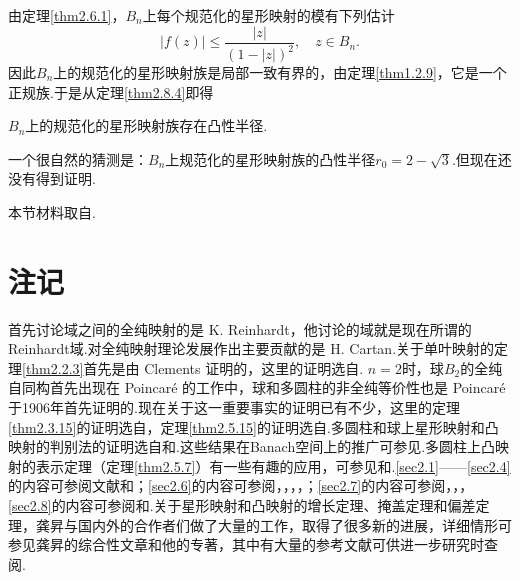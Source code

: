 由定理\ref{thm2.6.1}，$B_n$上每个规范化的星形映射的模有下列估计
\[|f(z)|\le\frac{|z|}{(1-|z|)^2},\quad z\in B_n.\]
因此$B_n$上的规范化的星形映射族是局部一致有界的，由定理\ref{thm1.2.9}，它是一个正规族.于是从定理\ref{thm2.8.4}即得
\begin{theorem}\label{thm2.8.6}
	$B_n$上的规范化的星形映射族存在凸性半径.
\end{theorem}
一个很自然的猜测是：$B_n$上规范化的星形映射族的凸性半径$r_0=2-\sqrt{3}$.但现在还没有得到证明.

本节材料取自\cite{史济怀1982bound}.
\section*{注记}
首先讨论域之间的全纯映射的是 K. Reinhardt，他讨论的域就是现在所谓的Reinhardt域.对全纯映射理论发展作出主要贡献的是 H. Cartan\cite[141—254，255—275，336—369]{cartan1979collected}.关于单叶映射的定理\ref{thm2.2.3}首先是由 Clements 证明的，这里的证明选自\cite{narasimhan1971several}. $n=2$时，球$B_2$的全纯自同构首先出现在 Poincar\'e 的工作中，球和多圆柱的非全纯等价性也是 Poincar\'e 于1906年首先证明的.现在关于这一重要事实的证明已有不少，这里的定理\ref{thm2.3.15}的证明选自\cite{rudin2008function}，定理\ref{thm2.5.15}的证明选自\cite{史济怀1981new}.多圆柱和球上星形映射和凸映射的判别法的证明选自\cite{suffridge1970principle}和\cite{kikuchi1973starlike}.这些结果在Banach空间上的推广可参见\cite{suffridge1973starlike}.多圆柱上凸映射的表示定理（定理\ref{thm2.5.7}）有一些有趣的应用，可参见\cite{miller1976subordinating}和\cite{史济怀1981new}.\ref{sec2.1}——\ref{sec2.4}的内容可参阅文献\cite{krantz2001function}和\cite{rudin2008function}；\ref{sec2.6}的内容可参阅\cite{barnard1991growth}，\cite{dong1992growth}，\cite{gong1991growth}，\cite{liu1989growth}，\cite{fitzgerald1990convex}；\ref{sec2.7}的内容可参阅\cite{barnard1994distortion}，\cite{duren1986distortion}，\cite{刘太顺1999n}，\ref{sec2.8}的内容可参阅\cite{戈卢津1956复变函数的几何理论}和\cite{史济怀1982bound}.关于星形映射和凸映射的增长定理、掩盖定理和偏差定理，龚{昇}与国内外的合作者们做了大量的工作，取得了很多新的进展，详细情形可参见龚{昇}的综合性文章\cite{gong1993biholomorphic}和他的专著\cite{龚昇1995多复变数的凸映照与星形映照}，其中有大量的参考文献可供进一步研究时查阅.